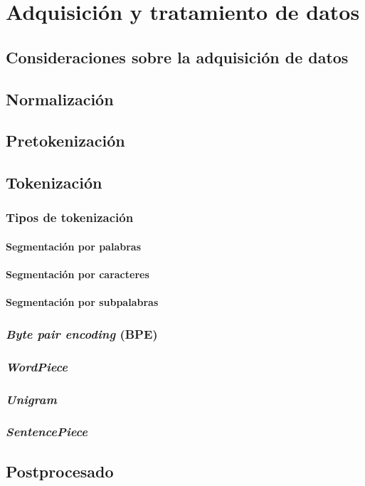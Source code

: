 \section{Adquisición y tratamiento de datos}
\subsection{Consideraciones sobre la adquisición de datos}
\subsection{Normalización}
\subsection{Pretokenización}
\subsection{Tokenización}
\subsubsection{Tipos de tokenización}
\paragraph{Segmentación por palabras}
\paragraph{Segmentación por caracteres}
\paragraph{Segmentación por subpalabras}
\subsubsection{\textit{Byte pair encoding} (BPE)}
\subsubsection{\textit{WordPiece}}
\subsubsection{\textit{Unigram}}
\subsubsection{\textit{SentencePiece}}
\subsection{Postprocesado}